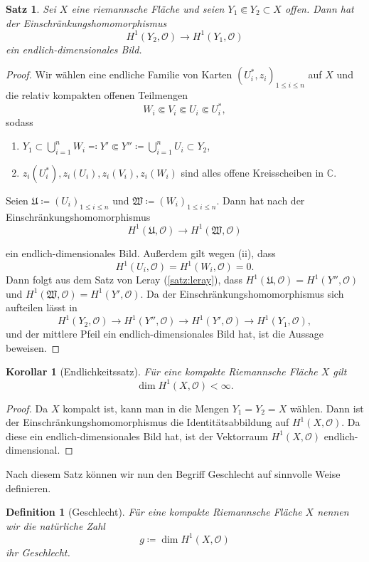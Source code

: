 \documentclass[11pt,a4paper,toc=bibliography]{scrartcl}
\theoremstyle{thm}
\newtheorem{satz}{Satz}[section]
\newtheorem{koro}{Korollar}[section]
\theoremstyle{def}
\newtheorem{defi}{Definition}[section]
\theoremstyle{remark}
\begin{document}
\begin{satz}
Sei $X$ eine riemannsche Fläche und seien $Y_1\Subset Y_2\subset X$ offen. Dann hat der Einschränkungshomomorphismus
\[
H^1(Y_2,\mathcal{O})\rightarrow H^1(Y_1,\mathcal{O})
\]
ein endlich-dimensionales Bild.
\end{satz}
\begin{proof}
Wir wählen eine endliche Familie von Karten $(U_i^*,z_i)_{1\leq i\leq n}$ auf $X$ und die relativ kompakten offenen Teilmengen
\[
W_i\Subset V_i\Subset U_i\Subset U_i^*,
\] 
sodass 
\begin{enumerate}
\item $Y_1\subset \bigcup_{i=1}^n W_i \eqqcolon Y'\Subset Y''\coloneqq \bigcup_{i=1}^n U_i\subset Y_2$,
\item $z_i(U_i^*),z_i(U_i),z_i(V_i),z_i(W_i)$ sind alles offene Kreisscheiben in $\mathbb{C}$.
\end{enumerate}
Seien $\mathfrak{U}\coloneqq (U_i)_{1\leq i\leq n}$ und $\mathfrak{W}\coloneqq (W_i)_{1\leq i\leq n}$. Dann hat nach  der Einschränkungshomomorphismus
\[
H^1(\mathfrak{U},\mathcal{O})\rightarrow H^1(\mathfrak{W},\mathcal{O})
\]

ein endlich-dimensionales Bild. Außerdem gilt wegen  (ii), dass \[H^1(U_i,\mathcal{O})=H^1(W_i,\mathcal{O})=0.\] 
Dann folgt aus dem Satz von Leray (\ref{satz:leray}), dass $H^1(\mathfrak{U},\mathcal{O})=H^1(Y'',\mathcal{O})$ und $H^1(\mathfrak{W},\mathcal{O})=H^1(Y',\mathcal{O})$. Da der Einschränkungshomomorphismus sich aufteilen lässt in 
\[
H^1(Y_2,\mathcal{O})\rightarrow H^1(Y'',\mathcal{O})\rightarrow H^1(Y',\mathcal{O})\rightarrow H^1(Y_1,\mathcal{O}),
\]
 und der mittlere Pfeil ein endlich-dimensionales Bild hat, ist die Aussage beweisen.
\end{proof}
\begin{koro}[Endlichkeitssatz]
Für eine kompakte Riemannsche Fläche $X$ gilt 
\[
\dim H^1(X,\mathcal{O})<\infty.
\]
\end{koro}
\begin{proof}
Da $X$ kompakt ist, kann man in  die Mengen $Y_1=Y_2=X$ wählen. Dann ist der Einschränkungshomomorphismus die Identitätsabbildung auf $H^1(X,\mathcal{O})$. Da diese ein endlich-dimensionales Bild hat, ist der Vektorraum $H^1(X,\mathcal{O})$ endlich-dimensional.
\end{proof}
Nach diesem Satz können wir nun den Begriff Geschlecht auf sinnvolle Weise definieren.
\begin{defi}[Geschlecht]
	Für eine kompakte Riemannsche Fläche $X$ nennen wir die  natürliche Zahl
	 \[
	 g\coloneqq  \dim H^1(X,\mathcal{O})
	\]
	ihr \emph{Geschlecht}.
\end{defi}
\end{document}
